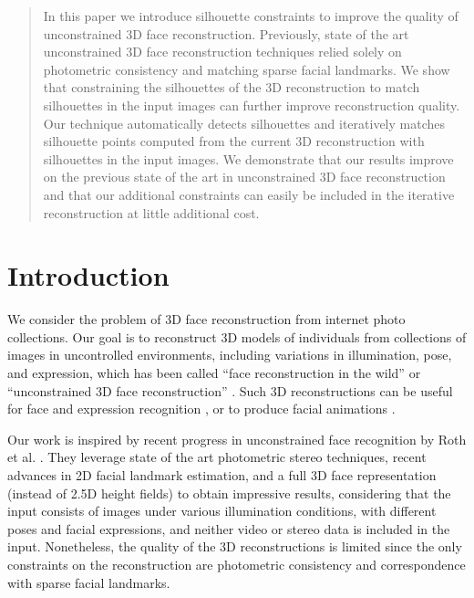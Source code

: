 \maketitle

\begin{abstract}
In this paper we introduce silhouette constraints to improve the quality of unconstrained 3D face reconstruction. Previously, state of the art unconstrained 3D face reconstruction techniques relied solely on photometric consistency and matching sparse facial landmarks. We show that constraining the silhouettes of the 3D reconstruction to match silhouettes in the input images can further improve reconstruction quality. Our technique automatically detects silhouettes and iteratively matches silhouette points computed from the current 3D reconstruction with silhouettes in the input images. We demonstrate that our results improve on the previous state of the art in unconstrained 3D face reconstruction and that our additional constraints can easily be included in the iterative reconstruction at little additional cost.

\end{abstract}


\section{Introduction}

We consider the problem of 3D face reconstruction from internet photo collections. Our goal is to reconstruct 3D models of individuals from collections of images in uncontrolled environments, including variations in illumination, pose, and expression, which has been called ``face reconstruction in the wild'' \cite{Kemelmacher-Shlizerman:2011:FRW} or ``unconstrained 3D face reconstruction'' \cite{Roth:2015:UFR}. Such 3D reconstructions can be useful for face and expression recognition \cite{Liu:2005:PFR,Wang:2006:FER}, or to produce facial animations \cite{Li:2013:RFA}.

Our work is inspired by recent progress in unconstrained face recognition by Roth et al. \cite{Roth:2015:UFR}. They leverage state of the art photometric stereo techniques, recent advances in 2D facial landmark estimation, and a full 3D face representation (instead of 2.5D height fields) to obtain impressive results, considering that the input consists of images under various illumination conditions, with different poses and facial expressions, and neither video or stereo data is included in the input. Nonetheless, the quality of the 3D reconstructions is limited since the only constraints on the reconstruction are photometric consistency and correspondence with sparse facial landmarks. 

